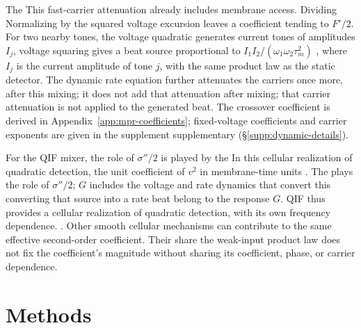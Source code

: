 \documentclass[11pt,a4paper]{article}
\newcommand{\Sig}{\sigma}
\providecommand{\DIFaddtex}[1]{{\protect\color{blue} \sf #1}} %
\providecommand{\DIFdeltex}[1]{{\protect\color{red} \scriptsize #1}} %
\providecommand{\DIFaddbegin}{} %
\providecommand{\DIFaddend}{} %
\providecommand{\DIFdelbegin}{} %
\providecommand{\DIFdelend}{} %
\providecommand{\DIFadd}[1]{\texorpdfstring{\DIFaddtex{#1}}{#1}} %
\providecommand{\DIFdel}[1]{\texorpdfstring{\DIFdeltex{#1}}{}} %
\begin{document}
\DIFdelbegin \DIFdel{The }\DIFdelend \DIFaddbegin \DIFadd{This }\DIFaddend fast-carrier attenuation \DIFdelbegin \DIFdel{already }\DIFdelend includes membrane access. \DIFdelbegin \DIFdel{Dividing }\DIFdelend \DIFaddbegin \DIFadd{Normalizing }\DIFaddend by the
squared voltage excursion leaves a coefficient tending to $F'/2$.
For two nearby \DIFdelbegin \DIFdel{tones, the voltage quadratic generates }\DIFdelend \DIFaddbegin \DIFadd{current tones of amplitudes $I_j$, voltage squaring gives }\DIFaddend a
beat source proportional to $I_1I_2/(\omega_1\omega_2\tau_m^2)$\DIFdelbegin \DIFdel{, where $I_j$ is the current amplitude
of tone $j$, with the same product law as the static
detector}\DIFdelend .
The dynamic rate equation \DIFaddbegin \DIFadd{further }\DIFaddend attenuates the carriers \DIFdelbegin \DIFdel{once more, after this mixing;
it does not add that attenuation }\DIFdelend \DIFaddbegin \DIFadd{after mixing;
that carrier attenuation is not applied }\DIFaddend to the generated beat. The crossover \DIFdelbegin \DIFdel{coefficient }\DIFdelend is derived in
Appendix~\ref{app:mpr-coefficients}; fixed-voltage coefficients and carrier
exponents are \DIFdelbegin \DIFdel{given in the supplement
}\DIFdelend \DIFaddbegin \DIFadd{supplementary }\DIFaddend (\S\ref{supp:dynamic-details}).

\DIFdelbegin \DIFdel{For the QIF mixer, the role of $\Sig''/2$ is played by the }\DIFdelend \DIFaddbegin \DIFadd{In this cellular realization of quadratic detection, the }\DIFaddend unit coefficient of $v^2$ in membrane-time units
\DIFdelbegin \DIFdel{. The }\DIFdelend \DIFaddbegin \DIFadd{plays the role of $\Sig''/2$; $G$ includes the }\DIFaddend voltage and rate dynamics
\DIFdelbegin \DIFdel{that convert
this }\DIFdelend \DIFaddbegin \DIFadd{converting that }\DIFaddend source into a rate beat\DIFdelbegin \DIFdel{belong to the response $G$. QIF thus provides a cellular realization of quadratic detection, with its
own frequency dependence. }\DIFdelend \DIFaddbegin \DIFadd{. }\DIFaddend Other smooth cellular mechanisms
\DIFdelbegin \DIFdel{can contribute
to the same effective second-order coefficient. Their }\DIFdelend \DIFaddbegin \DIFadd{share the }\DIFaddend weak-input product law \DIFdelbegin \DIFdel{does not fix the coefficient's magnitude}\DIFdelend \DIFaddbegin \DIFadd{without sharing its coefficient}\DIFaddend , phase,
or carrier dependence.

\section{Methods}
\end{document}
